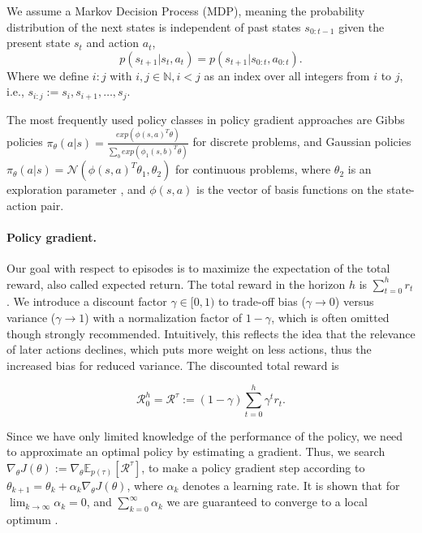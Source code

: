We assume a Markov Decision Process (MDP), meaning the probability distribution of the next states is independent of past states $s_{0:t-1}$ given the present state $s_t$ and action $a_t$, 
\begin{equation}
	p(s_{t+1}|s_t,a_t)=p(s_{t+1}|s_{0:t},a_{0:t}).
\end{equation}
Where we define $i:j$ with $i,j \in \mathbb{N}, i < j$ as an index over all integers from $i$ to $j$, i.e., $s_{i:j} := s_i, s_{i+1}, \dots, s_j$. 

The most frequently used policy classes in policy gradient approaches are Gibbs policies $\pi_\theta(a|s) = \frac{exp(\phi(s,a)^T\theta)}{\sum_b exp(\phi_1(s,b)^T\theta)}$ \cite{Sutton:1999:PGM:3009657.3009806,Bagnell2004LearningD} for discrete problems, and Gaussian policies $\pi_\theta(a|s) = \mathcal{N}(\phi(s,a)^T\theta_1,\theta_2)$ for continuous problems, where $\theta_2$ is an exploration parameter \cite{Williams92simplestatistical,peter:article:1996}, and $\phi(s,a)$ is the vector of basis functions on the state-action pair.

\paragraph{Policy gradient.} 
Our goal with respect to episodes is to maximize the expectation of the total reward, also called expected return. 
The total reward in the horizon $h$ is $\sum_{t=0}^{h} r_{t}$. 
We introduce a discount factor $\gamma \in [0,1)$ to trade-off bias ($\gamma\to0$) versus variance ($\gamma\to1$) with a normalization factor of $1-\gamma$, which is often omitted though strongly recommended.
Intuitively, this reflects the idea that the relevance of later actions declines, which puts more weight on less actions, thus the increased bias for reduced variance. 
The discounted total reward is 

\begin{equation}
  \mathcal{R}_0^h = \mathcal{R}^\tau := (1-\gamma) \sum_{t=0}^{h} \gamma^t r_t.
  \label{eqn:acc-reward}
\end{equation}

Since we have only limited knowledge of the performance of the policy, we need to approximate an optimal policy by estimating a gradient. 
Thus, we search $\nabla_\theta J(\theta) := \nabla_\theta \mathbb{E}_{p(\tau)}\left[\mathcal{R}^\tau\right]$, to make a policy gradient step according to $\theta_{k+1} = \theta_k + \alpha_k \nabla_\theta J(\theta)$, where $\alpha_k$ denotes a learning rate. 
It is shown that for $\lim_{k\to\infty}\alpha_k = 0$, and $\sum_{k=0}^\infty \alpha_k$ we are guaranteed to converge to a local optimum \cite{Sutton:1999:PGM:3009657.3009806}.

